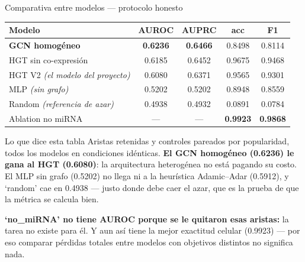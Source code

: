 \begin{frame}{Comparativa entre modelos --- protocolo honesto}
  \small
  \begin{tabular}{lcccc}
    \toprule
    \textbf{Modelo} & \textbf{AUROC} & \textbf{AUPRC} & \textbf{acc} & \textbf{F1} \\
    \midrule
    \textbf{GCN homog\'eneo} & \textbf{0.6236} & \textbf{0.6466} & 0.8498 & 0.8114 \\
    HGT sin co-expresi\'on & 0.6185 & 0.6452 & 0.9675 & 0.9468 \\
    HGT V2 \emph{(el modelo del proyecto)} & 0.6080 & 0.6371 & 0.9565 & 0.9301 \\
    MLP \emph{(sin grafo)} & 0.5202 & 0.5202 & 0.8948 & 0.8559 \\
    Random \emph{(referencia de azar)} & 0.4938 & 0.4932 & 0.0891 & 0.0784 \\
    Ablation no miRNA & --- & --- & \textbf{0.9923} & \textbf{0.9868} \\
    \bottomrule
  \end{tabular}

  \vspace{0.4em}
  \begin{block}{Lo que dice esta tabla}
    \scriptsize
    Aristas retenidas y controles pareados por popularidad, todos los modelos en
    condiciones id\'enticas. \textbf{El GCN homog\'eneo (0.6236) le gana al HGT (0.6080)}:
    la arquitectura heterog\'enea no est\'a pagando su costo. El MLP sin grafo (0.5202) no
    llega ni a la heur\'istica Adamic--Adar (0.5912), y `random' cae en 0.4938 --- justo
    donde debe caer el azar, que es la prueba de que la m\'etrica se calcula bien.

    \vspace{0.2em}
    \textbf{`no\_miRNA' no tiene AUROC porque se le quitaron esas aristas:} la tarea no
    existe para \'el. Y aun as\'i tiene la mejor exactitud celular (0.9923) --- por eso
    comparar p\'erdidas totales entre modelos con objetivos distintos no significa nada.
  \end{block}
\end{frame}

